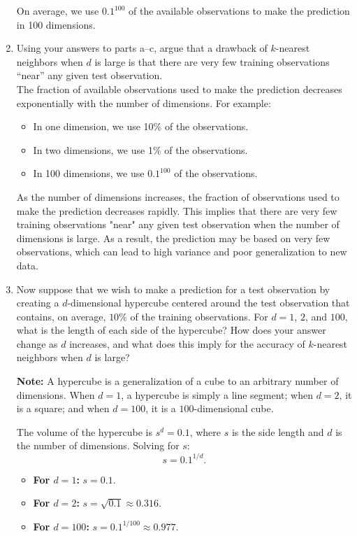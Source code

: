 \documentclass[a3paper,12pt]{extarticle} %
\begin{document}
\begin{enumerate}
\begin{itemize}
    \end{itemize}
    On average, we use \(0.1^{100}\) of the available observations to make the prediction in 100 dimensions.
    
    \item Using your answers to parts a–c, argue that a drawback of $k$-nearest neighbors when $d$ is large is that there are very few training observations “near” any given test observation.
    \\ The fraction of available observations used to make the prediction decreases exponentially with the number of dimensions. For example:
    \begin{itemize}
        \item In one dimension, we use 10\% of the observations.
        \item In two dimensions, we use 1\% of the observations.
        \item In 100 dimensions, we use \(0.1^{100}\) of the observations.
    \end{itemize}
    As the number of dimensions increases, the fraction of observations used to make the prediction decreases rapidly. This implies that there are very few training observations "near" any given test observation when the number of dimensions is large. As a result, the prediction may be based on very few observations, which can lead to high variance and poor generalization to new data.
    \item Now suppose that we wish to make a prediction for a test observation by creating a $d$-dimensional hypercube centered around the test observation that contains, on average, $10\%$ of the training observations. For $d = 1$, $2$, and $100$, what is the length of each side of the hypercube? How does your answer change as $d$ increases, and what does this imply for the accuracy of $k$-nearest neighbors when $d$ is large?
    
    \textbf{Note:} A hypercube is a generalization of a cube to an arbitrary number of dimensions. When $d = 1$, a hypercube is simply a line segment; when $d = 2$, it is a square; and when $d = 100$, it is a $100$-dimensional cube.
    
The volume of the hypercube is \(s^d = 0.1\), where \(s\) is the side length and \(d\) is the number of dimensions. Solving for \(s\):
\[
s = 0.1^{1/d}.
\]

\begin{itemize}
    \item \textbf{For \(d = 1\):} \(s = 0.1\).
    \item \textbf{For \(d = 2\):} \(s = \sqrt{0.1} \approx 0.316\).
    \item \textbf{For \(d = 100\):} \(s = 0.1^{1/100} \approx 0.977\).
\end{itemize}



\end{enumerate}
\end{document}
